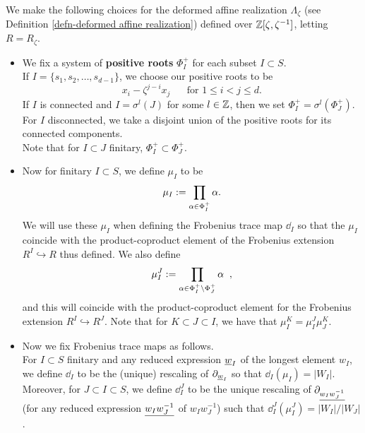 \begin{defn}\label{defn deformed affine frobenius realization}
We make the following choices for the deformed affine realization $\Lambda_{\zeta}$ (see Definition \ref{defn-deformed affine realization}) defined over $\mathbb{Z}[\zeta,\zeta^{-1}]$, letting $R = R_{\zeta}$.
\begin{itemize}
    \item We fix a system of \textbf{positive roots} $\Phi_I^+$ for each subset $I\subset S$. 
    \\If $I=\{s_1, s_2, \ldots , s_{d-1}\}$, we choose our positive roots to be 
    $$x_i - \zeta^{j-i}x_j \hspace{20pt} \text{for } 1\leq i<j\leq d.$$
    If $I$ is connected and $I = \sigma^l(J)$ for some $l \in \mathbb{Z}$, then we set $\Phi^+_I = \sigma^l(\Phi^+_J)$.
    \\ For $I$ disconnected, we take a disjoint union of the positive roots for its connected components.
    \\ Note that for $I \subset J$ finitary, $\Phi^+_I \subset \Phi^+_J$.
    \item Now for finitary $I \subset S$, we define $\mu_I$ to be 
    $$\mu_I:= \prod_{\alpha \in \Phi_I^+} \alpha.$$
    We will use these $\mu_I$ when defining the Frobenius trace map $\dd_I$ so that the $\mu_I$ coincide with the product-coproduct element of the Frobenius extension $R^I \hookrightarrow R$ thus defined.
    We also define $$\mu_I^J:= \prod_{\alpha \in \Phi_I^+\setminus \Phi_J^+}\alpha\;\;,$$
     and this will coincide with the product-coproduct element for the Frobenius extension $R^I \hookrightarrow R^J$. 
     Note that for $K\subset  J \subset I$, we have that $\mu^K_I=\mu^J_I\mu^K_J.$
    \item Now we fix Frobenius trace maps as follows.
    \\For $I \subset S$ finitary and any reduced expression $\underline{w}_I$ of the longest element $w_I$, we define $\dd_I$ to be the (unique) rescaling of $\partial_{\underline{w}_I}$ so that $\dd_I(\mu_I)= |W_I|.$  Moreover, for $J \subset I \subset S$, we define $\dd_I^J$ to be the unique rescaling of $\partial_{\underline{w_Iw_J^{-1}}}$ (for any reduced expression $\underline{w_Iw_J^{-1}}$ of $w_Iw_J^{-1}$) such that $\dd^J_I(\mu_I^J)=|W_I|/|W_J|$.
    

\end{itemize}
\end{defn}
